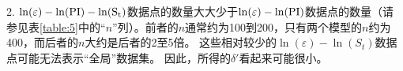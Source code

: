 \begin{Parallel}{0.60\textwidth}{}
{        2. $\ln(\varepsilon)-\ln(\rm{PI})-\ln(S_t)$数据点的数量大大少于$\ln(\varepsilon)-\ln(\rm{PI})$数据点的数量（请参见表\ref{table:5}中的“$n$”列）。前者的$n$通常约为100到200，只有两个模型的$n$约为400，而后者的$n$大约是后者的2至5倍。 这些相对较少的$\ln(\varepsilon)-\ln(S_t)$数据点可能无法表示“全局”数据集。 因此，所得的$\delta'$看起来可能很小。
    }
\end{Parallel}
